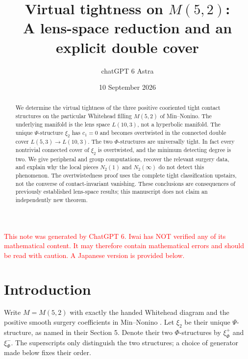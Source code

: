 \documentclass[12pt]{amsart}
\title[Virtual tightness on M(5,2)]{Virtual tightness on $M(5,2)$:\\
A lens-space reduction and an explicit double cover}
\author{chatGPT 6 Astra}
\date{10 September 2026}
\theoremstyle{definition}
\theoremstyle{remark}
\numberwithin{equation}{section}
\newcommand{\xr}[1]{\textcolor{red}{#1}}
\theoremstyle{definition}
\begin{document}
\begin{abstract}
We determine the virtual tightness of the three positive cooriented tight contact structures on the particular Whitehead filling $M(5,2)$ of Min--Nonino. The underlying manifold is the lens space $L(10,3)$, not a hyperbolic manifold. The unique $\Psi$-structure $\xi_2$ has $c_1=0$ and becomes overtwisted in the connected double cover $L(5,3)\to L(10,3)$. The two $\Phi$-structures are universally tight. In fact every nontrivial connected cover of $\xi_2$ is overtwisted, and the minimum detecting degree is two. We give peripheral and group computations, recover the relevant surgery data, and explain why the local pieces $N_2(1)$ and $N_2(\infty)$ do not detect this phenomenon. The overtwistedness proof uses the complete tight classification upstairs, not the converse of contact-invariant vanishing. These conclusions are consequences of previously established lens-space results; this manuscript does not claim an independently new theorem.
\end{abstract}
\maketitle
\tableofcontents

\xr{This note was generated by ChatGPT 6. Iwai has NOT verified any of its mathematical content. It may therefore contain mathematical errors and should be read with caution. A Japanese version is provided below.}

\section{Introduction}\label{en-intro}
Write $M=M(5,2)$ with exactly the handed Whitehead diagram and the positive smooth surgery coefficients in Min--Nonino \cite{en-MN}. Let $\xi_2$ be their unique $\Psi$-structure, as named in their Section 5. Denote their two $\Phi$-structures by $\xi_\Phi^+$ and $\xi_\Phi^-$. The superscripts only distinguish the two structures; a choice of generator made below fixes their order.
\end{document}
